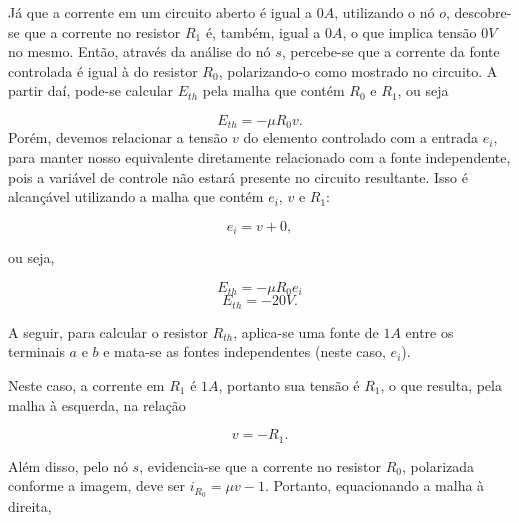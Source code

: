 \documentclass{article}
\numberwithin{equation}{section}
\begin{document}
\noindent Já que a corrente em um circuito aberto é igual a $0A$, utilizando o nó $o$, descobre-se que a corrente no resistor $R_1$ é, também, igual a $0A$, o que implica tensão $0V$ no mesmo. Então, através da análise do nó $s$, percebe-se que a corrente da fonte controlada é igual à do resistor $R_0$, polarizando-o como mostrado no circuito.
A partir daí, pode-se calcular $E_{th}$ pela malha que contém $R_0$ e $R_1$, ou seja

$$E_{th}=-\mu R_0v.$$
Porém, devemos relacionar a tensão $v$ do elemento controlado com a entrada $e_i$, para manter nosso equivalente diretamente relacionado com a fonte independente, pois a variável de controle não estará presente no circuito resultante. Isso é alcançável utilizando a malha que contém $e_i$, $v$ e $R_1$:

$$e_i=v+0,$$

\noindent ou seja,

$$E_{th}=-\mu R_0e_i$$
$$E_{th}=-20V.$$

\noindent A seguir, para calcular o resistor $R_{th}$, aplica-se uma fonte de $1A$ entre os terminais $a$ e $b$ e mata-se as fontes independentes (neste caso, $e_i$).

\begin{center}
\end{center}

\noindent Neste caso, a corrente em $R_1$ é $1A$, portanto sua tensão é $R_1$, o que resulta, pela malha à esquerda, na relação

$$v=-R_1.$$

\noindent Além disso, pelo nó $s$, evidencia-se que a corrente no resistor $R_0$, polarizada conforme a imagem, deve ser $i_{R_0}=\mu v - 1$. Portanto, equacionando a malha à direita,
\end{document}
